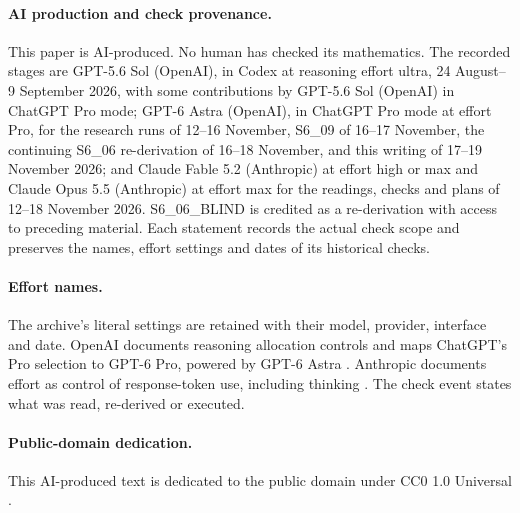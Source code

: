 \paragraph{AI production and check provenance.}
This paper is AI-produced. No human has checked its mathematics.
The recorded stages are GPT-5.6 Sol (OpenAI), in Codex at reasoning
effort ultra, 24 August--9 September 2026, with some contributions by
GPT-5.6 Sol (OpenAI) in ChatGPT Pro mode; GPT-6 Astra (OpenAI), in
ChatGPT Pro mode at effort Pro, for the research runs of 12--16
November, S6\_09 of 16--17 November, the continuing S6\_06 re-derivation
of 16--18 November, and this writing of 17--19 November 2026;
and Claude Fable 5.2 (Anthropic)
at effort high or max and Claude Opus 5.5 (Anthropic) at effort max
for the readings, checks and plans of 12--18 November 2026.
S6\_06\_BLIND is credited as a re-derivation with access to preceding
material. Each statement records the actual check scope and preserves
the names, effort settings and dates of its historical checks.

\paragraph{Effort names.}
The archive's literal settings are retained with their model, provider,
interface and date. OpenAI documents reasoning allocation controls
\cite[sections ``Reasoning effort'' and ``Reasoning mode'']{OpenAIReasoning2026}
and maps ChatGPT's Pro selection to GPT-6 Pro, powered by GPT-6 Astra
\cite[section ``Choose a thinking level'']{OpenAIChatGPTPro2026}.
Anthropic documents effort as control of response-token use, including
thinking \cite[sections ``How effort works'' and ``Effort levels'']{AnthropicEffort2026}.
The check event states what was read, re-derived or executed.

\paragraph{Public-domain dedication.}
This AI-produced text is dedicated to the public domain under
CC0 1.0 Universal \cite{CC01Universal}.

